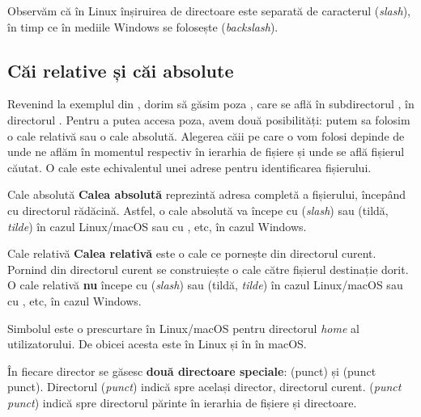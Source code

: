 Observăm că în Linux înșiruirea de directoare este separată de caracterul \file{/} (\textit{slash}), în timp ce în mediile Windows se folosește \file{\textbackslash{}} (\textit{backslash}).

\subsection{Căi relative și căi absolute}
\label{sec:fs:path}

Revenind la exemplul din , dorim să găsim poza , care se află în subdirectorul , în directorul . Pentru a putea accesa poza, avem două posibilități: putem sa folosim o cale relativă sau o cale absolută. Alegerea căii pe care o vom folosi depinde de unde ne aflăm în momentul respectiv în ierarhia de fișiere și unde se află fișierul căutat. O cale este echivalentul unei adrese pentru identificarea fișierului.

\begin{definition}{Cale absolută}
\textbf{Calea absolută} reprezintă adresa completă a fișierului, începând cu directorul rădăcină. Astfel, o cale absolută va începe cu \file{/} (\textit{slash}) sau \file{\textasciitilde{}} (tildă, \textit{tilde}) în cazul Linux/macOS sau cu ,  etc, în cazul Windows.
\end{definition}

\begin{definition}{Cale relativă}
\textbf{Calea relativă} este o cale ce pornește din directorul curent. Pornind din directorul curent se construiește o cale către fișierul destinație dorit. O cale relativă \textbf{nu} începe cu \file{/} (\textit{slash}) sau \file{\textasciitilde{}} (tildă, \textit{tilde}) în cazul Linux/macOS sau cu ,  etc, în cazul Windows.
\end{definition}

\begin{note}
Simbolul \file{\textasciitilde{}} este o prescurtare în Linux/macOS pentru directorul \textit{home} al utilizatorului. De obicei acesta este  în Linux și în  în macOS.
\end{note}

În fiecare director se găsesc \textbf{două directoare speciale}:  (punct) și  (punct punct). Directorul  (\textit{punct}) indică spre același director, directorul curent.  (\textit{punct punct}) indică spre directorul părinte în ierarhia de fișiere și directoare.

